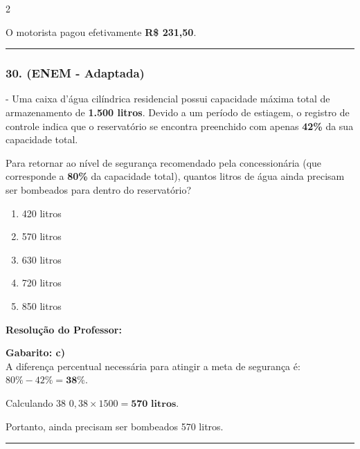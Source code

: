 \begin{multicols*}{2}
\begin{tcolorbox}[colback=CorTitUm!5, colframe=CorTitUm, boxrule=1pt, arc=4pt, left=6pt, right=6pt, top=6pt, bottom=6pt]
    O motorista pagou efetivamente \textbf{R\$ 231,50}.
    \end{tcolorbox}
\fi

\par\vspace{\espacoQuestao}

\noindent\textcolor{CorLinha}{\rule{\linewidth}{0.5pt}} 
\par\vspace{\espacoPreQuestao}
\subsubsection*{30. (ENEM - Adaptada)} - Uma caixa d'água cilíndrica residencial possui capacidade máxima total de armazenamento de \textbf{1.500 litros}. Devido a um período de estiagem, o registro de controle indica que o reservatório se encontra preenchido com apenas \textbf{42\%} da sua capacidade total.

Para retornar ao nível de segurança recomendado pela concessionária (que corresponde a \textbf{80\%} da capacidade total), quantos litros de água ainda precisam ser bombeados para dentro do reservatório?
\begin{enumerate}[label=\alph*), itemsep=\espacoAlt]
    \item 420 litros
    \item 570 litros
    \item 630 litros
    \item 720 litros
    \item 850 litros
\end{enumerate}

\ifgabarito
    \begin{tcolorbox}[colback=CorTitUm!5, colframe=CorTitUm, boxrule=1pt, arc=4pt, left=6pt, right=6pt, top=6pt, bottom=6pt]
    \small\textbf{\textcolor{CorTitUm}{Resolução do Professor:}}\par\vspace{0.1cm}
    \color{CinzaEscuro}
    \textbf{Gabarito: c)}\\
    A diferença percentual necessária para atingir a meta de segurança é:
    $80\% - 42\% = \textbf{38\%}$.
    
    Calculando 38%
    $0,38 \times 1500 = \mathbf{570\text{ litros}}$.
    
    Portanto, ainda precisam ser bombeados 570 litros.
    \end{tcolorbox}
\fi

\par\vspace{\espacoQuestao}
\noindent\textcolor{CorLinha}{\rule{\linewidth}{0.5pt}} 
\par\vspace{\espacoPreQuestao}

\end{multicols*}
